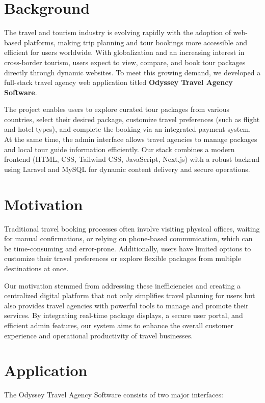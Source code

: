 \section{Background}
The travel and tourism industry is evolving rapidly with the adoption of web-based platforms, making trip planning and tour bookings more accessible and efficient for users worldwide. With globalization and an increasing interest in cross-border tourism, users expect to view, compare, and book tour packages directly through dynamic websites. To meet this growing demand, we developed a full-stack travel agency web application titled \textbf{Odyssey Travel Agency Software}. 

The project enables users to explore curated tour packages from various countries, select their desired package, customize travel preferences (such as flight and hotel types), and complete the booking via an integrated payment system. At the same time, the admin interface allows travel agencies to manage packages and local tour guide information efficiently. Our stack combines a modern frontend (HTML, CSS, Tailwind CSS, JavaScript, Next.js) with a robust backend using Laravel and MySQL for dynamic content delivery and secure operations.

\section{Motivation}
Traditional travel booking processes often involve visiting physical offices, waiting for manual confirmations, or relying on phone-based communication, which can be time-consuming and error-prone. Additionally, users have limited options to customize their travel preferences or explore flexible packages from multiple destinations at once.

Our motivation stemmed from addressing these inefficiencies and creating a centralized digital platform that not only simplifies travel planning for users but also provides travel agencies with powerful tools to manage and promote their services. By integrating real-time package displays, a secure user portal, and efficient admin features, our system aims to enhance the overall customer experience and operational productivity of travel businesses.

\section{Application}
The Odyssey Travel Agency Software consists of two major interfaces:

